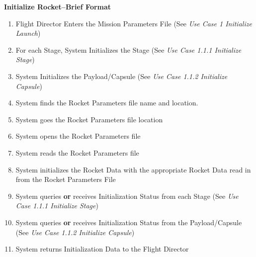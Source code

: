 \documentclass[letterpaper]{article}
\begin{document}
\noindent
\textbf{Initialize Rocket--Brief Format}
\begin{enumerate}
   \item Flight Director Enters the Mission Parameters File (See 
      \textit{Use Case 1 Initialize Launch})
   \item For each Stage, System Initializes the Stage (See 
      \textit{Use Case 1.1.1 Initialize Stage})
   \item System Initializes the Payload/Capsule (See 
      \textit{Use Case 1.1.2 Initialize Capsule})
   \item System finds the Rocket Parameters file name and location.
   \item System goes the Rocket Parameters file location
   \item System opens the Rocket Parameters file
   \item System reads the Rocket Parameters file
   \item System initializes the Rocket Data with the appropriate 
      Rocket Data read in from the Rocket Parameters File
   \item System queries \textbf{or} receives Initialization Status 
      from each Stage (See \textit{Use Case 1.1.1 Initialize Stage})
   \item System queries \textbf{or} receives Initialization Status
      from the Payload/Capsule (See 
      \textit{Use Case 1.1.2 Initialize Capsule})
   \item System returns Initialization Data to the Flight Director
\end{enumerate}
\end{document}
